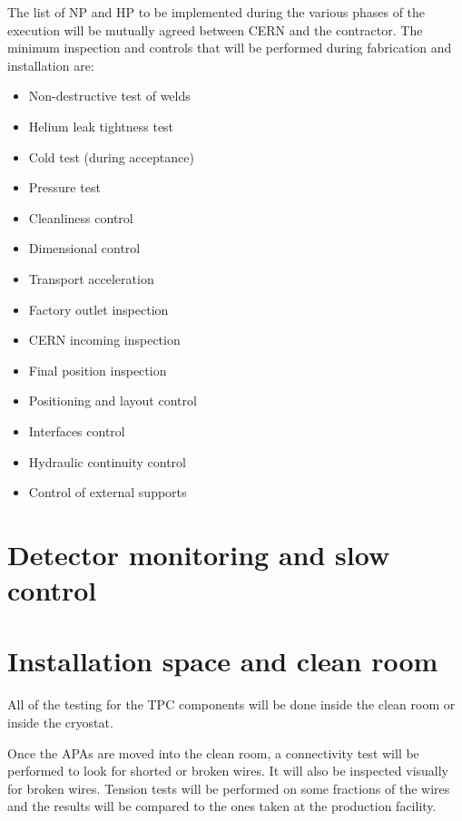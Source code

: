 The list of NP and HP to be implemented during the various phases of the execution will be mutually agreed between CERN and the contractor. The minimum inspection and controls that will be performed during fabrication and installation are:

\begin{itemize}
\item Non-destructive test of welds
\item Helium leak tightness test
\item Cold test (during acceptance)
\item Pressure test
\item Cleanliness control
\item Dimensional control
\item Transport acceleration
\item Factory outlet inspection
\item CERN incoming inspection
\item Final position inspection
\item Positioning and layout control
\item Interfaces control
\item Hydraulic continuity control
\item Control of external supports
\end{itemize}


\section{Detector monitoring and slow control}


\section{Installation space and clean room}
\label{sec:quality:space}

All of the testing for the TPC components will be done inside the clean room or inside the cryostat. 

Once the APAs are moved into the clean room, a connectivity test will be performed to look for shorted or broken wires.  It will also be inspected visually for broken wires.  Tension tests will be performed on some fractions of the wires and the results will be compared to the ones taken at the production facility.

